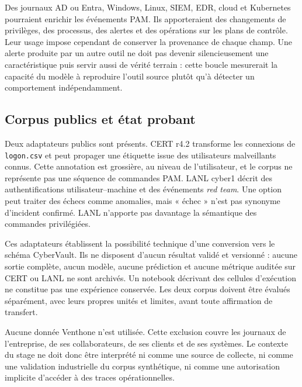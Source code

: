 \documentclass[11pt,a4paper,oneside]{report}
\theoremstyle{definition}
\theoremstyle{plain}
\begin{document}
Des journaux AD ou Entra, Windows, Linux, SIEM, EDR, cloud et Kubernetes
pourraient enrichir les événements PAM. Ils apporteraient des changements de
privilèges, des processus, des alertes et des opérations sur les plans de
contrôle. Leur usage impose cependant de conserver la provenance de chaque
champ. Une alerte produite par un autre outil ne doit pas devenir
silencieusement une caractéristique puis servir aussi de vérité terrain : cette
boucle mesurerait la capacité du modèle à reproduire l'outil source plutôt qu'à
détecter un comportement indépendamment.

\subsection{Corpus publics et état probant}

Deux adaptateurs publics sont présents. CERT r4.2 transforme les connexions de
\texttt{logon.csv} et peut propager une étiquette issue des utilisateurs
malveillants connus. Cette annotation est grossière, au niveau de l'utilisateur,
et le corpus ne représente pas une séquence de commandes PAM. LANL cyber1
décrit des authentifications utilisateur--machine et des événements
\emph{red team}. Une option peut traiter des échecs comme anomalies, mais
« échec » n'est pas synonyme d'incident confirmé. LANL n'apporte pas davantage
la sémantique des commandes privilégiées.

Ces adaptateurs établissent la possibilité technique d'une conversion vers le
schéma CyberVault. Ils ne disposent d'aucun résultat validé et versionné :
aucune sortie complète, aucun modèle, aucune prédiction et aucune métrique
auditée sur CERT ou LANL ne sont archivés. Un notebook décrivant des cellules
d'exécution ne constitue pas une expérience conservée. Les deux corpus doivent
être évalués séparément, avec leurs propres unités et limites, avant toute
affirmation de transfert.

Aucune donnée Venthone n'est utilisée. Cette exclusion couvre les journaux de
l'entreprise, de ses collaborateurs, de ses clients et de ses systèmes. Le
contexte du stage ne doit donc être interprété ni comme une source de collecte,
ni comme une validation industrielle du corpus synthétique, ni comme une
autorisation implicite d'accéder à des traces opérationnelles.
\end{document}
